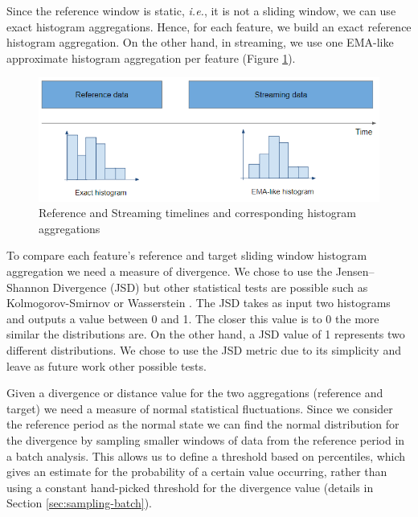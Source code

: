 Since the reference window is static, \textit{i.e.}, it is not a sliding window, we can use exact histogram aggregations. Hence, for each feature, we build an exact reference histogram aggregation. On the other hand, in streaming, we use one EMA-like approximate histogram aggregation per feature (Figure \ref{fig:timelines-hists}).


\begin{figure}[!htb]
    \begin{center}
      \includegraphics[scale=0.7]{figures/timelines-hists.png}
      \caption[]{Reference and Streaming timelines and corresponding histogram aggregations}
      \label{fig:timelines-hists}
    \end{center}
\end{figure}


To compare each feature's reference and target sliding window histogram aggregation we need a measure of divergence. We chose to use the Jensen–Shannon Divergence (JSD) \cite{JSD} but other statistical tests are possible such as Kolmogorov-Smirnov or Wasserstein \cite{EncyclopaediaMathematics}. The JSD takes as input two histograms and outputs a value between 0 and 1. The closer this value is to 0 the more similar the distributions are. On the other hand, a JSD value of 1 represents two different distributions. We chose to use the JSD metric due to its simplicity and leave as future work other possible tests. 

Given a divergence or distance value for the two aggregations (reference and target) we need a measure of normal statistical fluctuations. Since we consider the reference period as the normal state we can find the normal distribution for the divergence by sampling smaller windows of data from the reference period in a batch analysis. This allows us to define a threshold based on percentiles, which gives an estimate for the probability of a certain value occurring, rather than using a constant hand-picked threshold for the divergence value (details in Section \ref{sec:sampling-batch}). 


